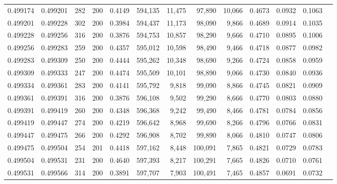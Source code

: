 \begin{tabular}{rrrrrrrrrrrrr}
0.499174 & 0.499201 &   282 & 200 &                                     0.4149 & 594,135 &  11,475 &  97,890 &  10,066 & 0.4673 & 0.0932 & 0.1063 \\
0.499201 & 0.499228 &   302 & 200 &                                     0.3984 & 594,437 &  11,173 &  98,090 &   9,866 & 0.4689 & 0.0914 & 0.1035 \\
0.499228 & 0.499256 &   316 & 200 &                                     0.3876 & 594,753 &  10,857 &  98,290 &   9,666 & 0.4710 & 0.0895 & 0.1006 \\
0.499256 & 0.499283 &   259 & 200 &                                     0.4357 & 595,012 &  10,598 &  98,490 &   9,466 & 0.4718 & 0.0877 & 0.0982 \\
0.499283 & 0.499309 &   250 & 200 &                                     0.4444 & 595,262 &  10,348 &  98,690 &   9,266 & 0.4724 & 0.0858 & 0.0959 \\
0.499309 & 0.499333 &   247 & 200 &                                     0.4474 & 595,509 &  10,101 &  98,890 &   9,066 & 0.4730 & 0.0840 & 0.0936 \\
0.499334 & 0.499361 &   283 & 200 &                                     0.4141 & 595,792 &   9,818 &  99,090 &   8,866 & 0.4745 & 0.0821 & 0.0909 \\
0.499361 & 0.499391 &   316 & 200 &                                     0.3876 & 596,108 &   9,502 &  99,290 &   8,666 & 0.4770 & 0.0803 & 0.0880 \\
0.499391 & 0.499419 &   260 & 200 &                                     0.4348 & 596,368 &   9,242 &  99,490 &   8,466 & 0.4781 & 0.0784 & 0.0856 \\
0.499419 & 0.499447 &   274 & 200 &                                     0.4219 & 596,642 &   8,968 &  99,690 &   8,266 & 0.4796 & 0.0766 & 0.0831 \\
0.499447 & 0.499475 &   266 & 200 &                                     0.4292 & 596,908 &   8,702 &  99,890 &   8,066 & 0.4810 & 0.0747 & 0.0806 \\
0.499475 & 0.499504 &   254 & 201 &                                     0.4418 & 597,162 &   8,448 & 100,091 &   7,865 & 0.4821 & 0.0729 & 0.0783 \\
0.499504 & 0.499531 &   231 & 200 &                                     0.4640 & 597,393 &   8,217 & 100,291 &   7,665 & 0.4826 & 0.0710 & 0.0761 \\
0.499531 & 0.499566 &   314 & 200 &                                     0.3891 & 597,707 &   7,903 & 100,491 &   7,465 & 0.4857 & 0.0691 & 0.0732 \\

\end{tabular}

